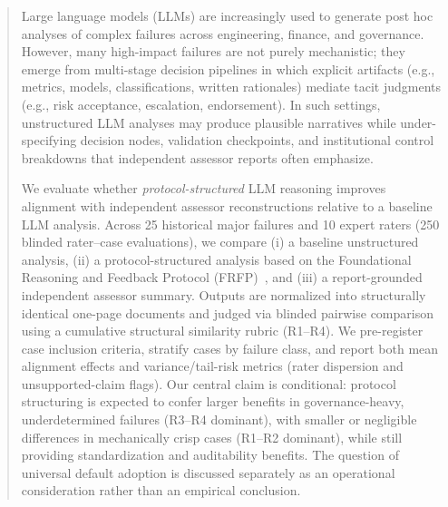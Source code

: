 \documentclass[preprints,accept]{Definitions/mdpi}
\theoremstyle{definition}
\begin{document}
\nolinenumbers  %
\begin{abstract}

Large language models (LLMs) are increasingly used to generate post hoc analyses of complex failures across engineering, finance, and governance. However, many high-impact failures are not purely mechanistic; they emerge from multi-stage decision pipelines in which explicit artifacts (e.g., metrics, models, classifications, written rationales) mediate tacit judgments (e.g., risk acceptance, escalation, endorsement). In such settings, unstructured LLM analyses may produce plausible narratives while under-specifying decision nodes, validation checkpoints, and institutional control breakdowns that independent assessor reports often emphasize.

We evaluate whether \emph{protocol-structured} LLM reasoning improves alignment with independent assessor reconstructions relative to a baseline LLM analysis. Across 25 historical major failures and 10 expert raters (250 blinded rater--case evaluations), we compare (i) a baseline unstructured analysis, (ii) a protocol-structured analysis based on the Foundational Reasoning and Feedback Protocol (FRFP)~\cite{frfp_vol1}, and (iii) a report-grounded independent assessor summary. Outputs are normalized into structurally identical one-page documents and judged via blinded pairwise comparison using a cumulative
structural similarity rubric (R1–R4). We pre-register case inclusion criteria, stratify cases by failure class, and report both mean alignment effects and variance/tail-risk metrics (rater dispersion and unsupported-claim flags). Our central claim is conditional: protocol structuring is expected to confer larger benefits in governance-heavy, underdetermined failures (R3--R4 dominant), with smaller or negligible differences in mechanically crisp cases (R1--R2 dominant), while still providing standardization and auditability benefits. The question of universal default adoption is discussed separately as an operational consideration rather than an empirical conclusion.
    
\end{abstract}
\pagebreak
\tableofcontents %
\pagebreak







\appendix

\end{document}
